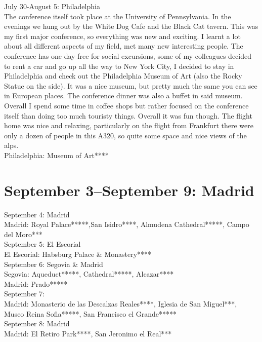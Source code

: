 July 30-August 5: Philadelphia\\
The conference itself took place at the University of Pennsylvania. In the evenings we hung out by the White Dog Cafe and the Black Cat tavern. This was my first major conference, so everything was new and exciting. I learnt a lot about all different aspects of my field, met many new interesting people. The conference has one day free for social excursions, some of my colleagues decided to rent a car and go up all the way to New York City, I decided to stay in Philadelphia and check out the Philadelphia Museum of Art (also the Rocky Statue on the side). It was a nice museum, but pretty much the same you can see in European places. The conference dinner was also a buffet in said museum. Overall I spend some time in coffee shops but rather focused on the conference itself than doing too much touristy things. Overall it was fun though. The flight home was nice and relaxing, particularly on the flight from Frankfurt there were only a dozen of people in this A320, so quite some space and nice views of the alps.\\

Philadelphia: Museum of Art****

\section{September 3--September 9: Madrid}
\label{2008:Madrid}

September 4: Madrid\\
Madrid: Royal Palace*****,San Isidro****, Almudena Cathedral*****, Campo del Moro***\\

September 5: El Escorial\\
El Escorial: Habsburg Palace \& Monastery****\\

September 6: Segovia \& Madrid\\
Segovia: Aqueduct*****, Cathedral*****, Alcazar****\\
Madrid: Prado*****\\

September 7:\\
Madrid: Monasterio de las Descalzas Reales****, Iglesia de San Miguel***, Museo Reina Sofia*****, San Francisco el Grande*****\\

September 8: Madrid\\
Madrid: El Retiro Park****, San Jeronimo el Real***\\

